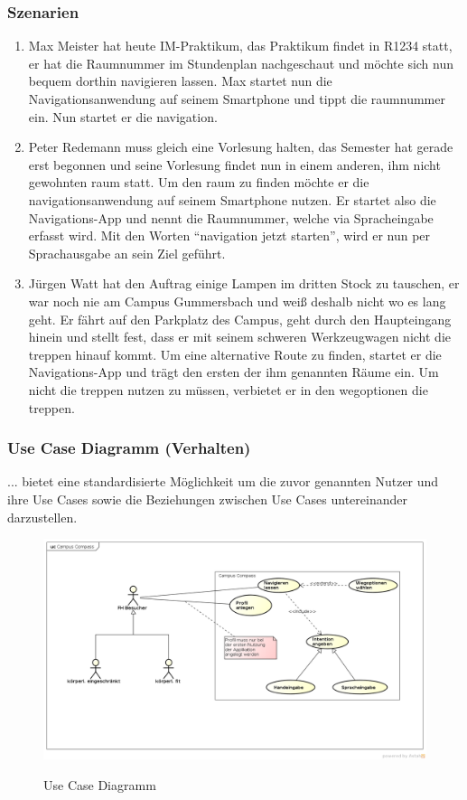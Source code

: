 \subsubsection*{Szenarien}
\begin{enumerate}
  \item Max Meister hat heute IM-Praktikum, das Praktikum findet in R1234 statt, er hat die Raumnummer im Stundenplan nachgeschaut und möchte sich nun bequem dorthin navigieren lassen. Max startet nun die Navigationsanwendung auf seinem Smartphone und tippt die \gls{raum}nummer ein. Nun startet er die \gls{navigation}.
  \item Peter Redemann muss gleich eine Vorlesung halten, das Semester hat gerade erst begonnen und seine Vorlesung findet nun in einem anderen, ihm nicht gewohnten \gls{raum} statt. Um den \gls{raum} zu finden möchte er die \gls{navigation}sanwendung auf seinem Smartphone nutzen. Er startet also die Navigations-App und nennt die Raumnummer, welche via Spracheingabe erfasst wird. Mit den Worten “\gls{navigation} jetzt starten”, wird er nun per Sprachausgabe an sein Ziel geführt.
  \item Jürgen Watt hat den Auftrag einige Lampen im dritten Stock zu tauschen, er war noch nie am Campus Gummersbach und weiß deshalb nicht wo es lang geht. Er fährt auf den Parkplatz des Campus, geht durch den Haupteingang hinein und stellt fest, dass er mit seinem schweren Werkzeugwagen nicht die \gls{treppe}n hinauf kommt. Um eine alternative Route zu finden, startet er die Navigations-App und trägt den ersten der ihm genannten Räume ein. Um nicht die \gls{treppe}n nutzen zu müssen, verbietet er in den \gls{weg}optionen die \gls{treppe}n.
\end{enumerate}

\subsubsection*{Use Case Diagramm (Verhalten)}
... bietet eine standardisierte Möglichkeit um die zuvor genannten Nutzer und ihre Use Cases sowie die Beziehungen zwischen Use Cases untereinander darzustellen.

\begin{figure}[hbt]
  \centering
  \includegraphics[width=\linewidth]{img/use-case-diagram.png}
  \label{img:use-case-diagramm}
  \caption{Use Case Diagramm}
\end{figure}

